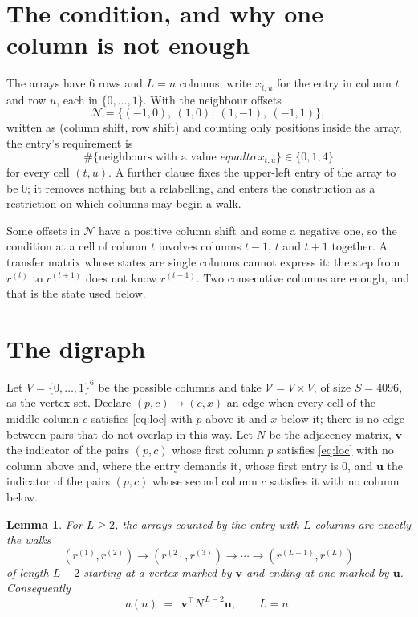 \documentclass[11pt,a4paper]{article}
\theoremstyle{plain}
\newtheorem{lemma}[theorem]{Lemma}
\theoremstyle{definition}
\begin{document}
\section{The condition, and why one column is not enough}

The arrays have $6$ rows and $L=n$ columns; write $x_{t,u}$ for the entry in
column $t$ and row $u$, each in $\{0,\dots,1\}$. With the neighbour offsets
\[
\mathcal N=\{(-1,0),\ (1,0),\ (1,-1),\ (-1,1)\},
\]
written as (column shift, row shift) and counting only positions inside the array, the
entry's requirement is
\begin{equation}\label{eq:loc}
\#\{\text{neighbours with a value }equal to\ x_{t,u}\}\in\{0,1,4\}
\end{equation}
for every cell $(t,u)$. A further clause fixes the upper-left entry of the array to be $0$; it removes nothing but a relabelling, and enters the construction as a restriction on which columns may begin a walk.

Some offsets in $\mathcal N$ have a positive column shift and some a negative one, so the
condition at a cell of column $t$ involves columns $t-1$, $t$ and $t+1$ together. A transfer
matrix whose states are single columns cannot express it: the step from $r^{(t)}$ to
$r^{(t+1)}$ does not know $r^{(t-1)}$. Two consecutive columns are enough, and that is
the state used below.

\section{The digraph}

Let $V=\{0,\dots,1\}^{6}$ be the possible columns and take
$\mathcal V=V\times V$, of size $S=4096$, as the vertex set. Declare $(p,c)\to(c,x)$ an edge
when every cell of the middle column $c$ satisfies \eqref{eq:loc} with $p$ above it and $x$
below it; there is no edge between pairs that do not overlap in this way. Let $N$ be the
adjacency matrix, $\mathbf{v}$ the indicator of the pairs $(p,c)$ whose first column $p$
satisfies \eqref{eq:loc} with no column above and, where the entry demands it, whose first entry is $0$, and $\mathbf{u}$ the indicator of
the pairs $(p,c)$ whose second column $c$ satisfies it with no column below.

\begin{lemma}\label{lem:walk}
For $L\ge2$, the arrays counted by the entry with $L$ columns are exactly the walks
\[
(r^{(1)},r^{(2)})\to(r^{(2)},r^{(3)})\to\cdots\to(r^{(L-1)},r^{(L)})
\]
of length $L-2$ starting at a vertex marked by $\mathbf{v}$ and ending at one marked by
$\mathbf{u}$. Consequently
\[
a(n)\;=\;\,\mathbf{v}^{\!\top}N^{\,L-2}\mathbf{u},\qquad L=n .
\]
\end{lemma}
\end{document}

